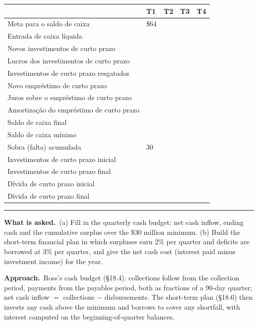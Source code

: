 \documentclass[11pt,a4paper]{article}
\newcommand{\asked}{\par\medskip\noindent\textbf{What is asked.}~}
\newcommand{\approach}{\par\smallskip\noindent\textbf{Approach.}~}
\newcommand{\stmtend}{\par\endgroup\nopagebreak\noindent\rule{\linewidth}{0.4pt}\par\medskip}
\begin{document}
{\def\LTcaptype{none} %
\begin{longtable}[]{@{}lllll@{}}
\toprule\noalign{}
& T1 & T2 & T3 & T4 \\
\midrule\noalign{}
\endhead
\bottomrule\noalign{}
\endlastfoot
Meta para o saldo de caixa & \$64 & & & \\
Entrada de caixa líquida & & & & \\
Novos investimentos de curto prazo & & & & \\
Lucros dos investimentos de curto prazo & & & & \\
Investimentos de curto prazo resgatados & & & & \\
Novo empréstimo de curto prazo & & & & \\
Juros sobre o empréstimo de curto prazo & & & & \\
Amortização do empréstimo de curto prazo & & & & \\
Saldo de caixa final & & & & \\
Saldo de caixa mínimo & & & & \\
Sobra (falta) acumulada & 30 & & & \\
Investimentos de curto prazo inicial & & & & \\
Investimentos de curto prazo final & & & & \\
Dívida de curto prazo inicial & & & & \\
Dívida de curto prazo final & & & & \\
\end{longtable}
}
\stmtend

\asked (a) Fill in the quarterly cash budget: net cash inflow, ending cash and the cumulative
surplus over the \$30 million minimum. (b) Build the short-term financial plan in which surpluses
earn 2\% per quarter and deficits are borrowed at 3\% per quarter, and give the net cash cost
(interest paid minus investment income) for the year.

\approach Ross's cash budget (\S18.4): collections follow from the collection period, payments
from the payables period, both as fractions of a 90-day quarter; net cash inflow $=$ collections
$-$ disbursements. The short-term plan (\S18.6) then invests any cash above the minimum and
borrows to cover any shortfall, with interest computed on the beginning-of-quarter balances.
\end{document}
